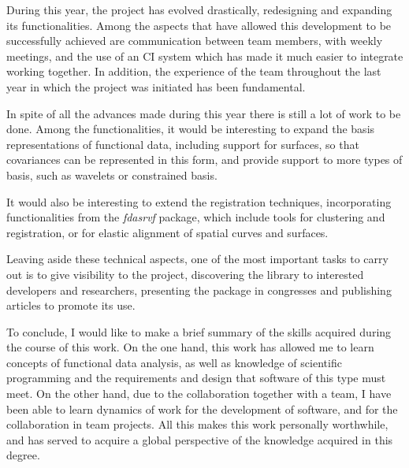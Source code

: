 
During this year, the project has evolved drastically, redesigning and expanding
its functionalities.
Among the aspects that have allowed this development to be successfully achieved
are communication between team members, with weekly meetings, and the use of
an CI system which has made it much easier to integrate working together.
In addition, the experience of the team throughout the last year in which the
project was initiated has been fundamental.

In spite of all the advances made during this year there is still a lot of work
to be done.
Among the functionalities, it would be interesting to expand the basis
representations of functional data, including support for surfaces, so that
covariances can be represented in this form, and provide support to more types of basis,
such as wavelets \cite{Morettin2017} or constrained basis\cite{Ramsay2005}.

It would also be interesting to extend the registration techniques,
incorporating functionalities from the \textit{fdasrvf}\cite{fdasrvf} package,
which include tools for clustering and registration, or for elastic
alignment of spatial curves and surfaces.

Leaving aside these technical aspects, one of the most important tasks to carry
out is to give visibility to the project, discovering the library to interested
developers and researchers, presenting the package in congresses and publishing
articles to promote its use.

To conclude, I would like to make a brief summary of the skills acquired during
the course of this work. On the one hand, this work has allowed me to learn concepts
of functional data analysis, as well as knowledge of scientific programming
and the requirements and design that software of this type must meet.
On the other hand, due to the collaboration together with a team,
I have been able to learn dynamics of work for the development of software,
and for the collaboration in team projects.
All this  makes this work personally worthwhile,  and has served to acquire a
global perspective of the knowledge acquired in this degree.
